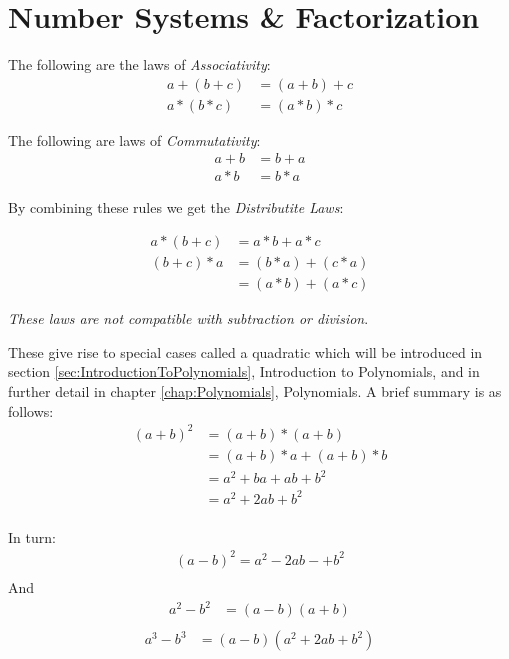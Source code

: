 \chapter{Number Systems \& Factorization}
\label{sec:NumberSystemsAndFactorization}
The following are the laws of \emph{Associativity}:
\begin{align}
  a + (b + c) & = (a+ b) + c \label{eq:assoc0}\\
  a * (b * c) & = (a * b) * c \label{eq:assoc1}
\end{align}


The following are laws of \emph{Commutativity}:
\begin{align}
  a + b & = b + a \label{eq:commut0} \\
  a * b & = b * a \label{eq:commut1}
\end{align}

By combining these rules we get the \emph{Distributite Laws}:

\begin{align}
      a* (b+c) & = a*b + a*c \label{eq:distrib0} \\
   (b+c) * a & = (b * a) + (c * a) \label{eq:distrib1} \\
    & = (a*b) + (a * c) \label{eq:distrib2}
\end{align}

\emph{These laws are not compatible with subtraction or division}.

These give rise to special cases called a quadratic which will be introduced in
section \ref{sec:IntroductionToPolynomials}, Introduction to Polynomials, and in
further detail in chapter \ref{chap:Polynomials}, Polynomials. A brief summary
is as follows:
\begin{align}
  (a + b)^2 & = (a+b)*(a+b) \\
   & = (a+b) * a + (a+b)* b \\
   & = a^2 + ba + ab + b^2 \\
   & = a^2 + 2ab + b^2 \\
\end{align}

In turn:
\begin{align}
  (a-b)^2 = a^2 - 2ab - +b^2 \\
\end{align} 
And
\begin{align}
  a^2 - b^2 & = (a-b)(a+b) \\
\end{align}
\begin{align}
  a^3 - b^3 & =(a-b)(a^2+2ab+b^2) \\ 
\end{align}



